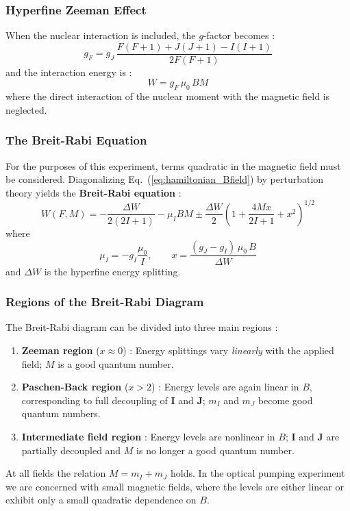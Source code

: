 \subsubsection*{Hyperfine Zeeman Effect}
 
When the nuclear interaction is included, the $g$-factor becomes :
\begin{equation}
    g_F = g_J\,\frac{F(F+1) + J(J+1) - I(I+1)}{2F(F+1)}
    \label{eq:gF}
\end{equation}
and the interaction energy is :
\begin{equation}
    W = g_F\,\mu_0\,BM
    \label{eq:W_hyperfine}
\end{equation}
where the direct interaction of the nuclear moment with the magnetic field is neglected.
 
\subsubsection*{The Breit-Rabi Equation}
 
For the purposes of this experiment, terms quadratic in the magnetic field must be
considered. Diagonalizing Eq.~(\ref{eq:hamiltonian_Bfield}) by perturbation theory yields
the \textbf{Breit-Rabi equation} :
\begin{equation}
    W(F,M) = -\frac{\Delta W}{2(2I+1)} - \mu_I BM
    \pm \frac{\Delta W}{2}
    \left(1 + \frac{4Mx}{2I+1} + x^2\right)^{1/2}
    \label{eq:breit_rabi}
\end{equation}
where
\begin{equation}
    \mu_I = -g_I\frac{\mu_0}{I},
    \qquad
    x = \frac{(g_J - g_I)\,\mu_0\,B}{\Delta W}
    \label{eq:BR_params}
\end{equation}
and $\Delta W$ is the hyperfine energy splitting.
 
\subsubsection*{Regions of the Breit-Rabi Diagram}
 
The Breit-Rabi diagram can be divided into three main regions :
\begin{enumerate}
    \item \textbf{Zeeman region} ($x \approx 0$) : Energy splittings vary \emph{linearly}
          with the applied field; $M$ is a good quantum number.
    \item \textbf{Paschen-Back region} ($x > 2$) : Energy levels are again linear in $B$,
          corresponding to full decoupling of $\mathbf{I}$ and $\mathbf{J}$; $m_I$ and
          $m_J$ become good quantum numbers.
    \item \textbf{Intermediate field region} : Energy levels are nonlinear in $B$;
          $\mathbf{I}$ and $\mathbf{J}$ are partially decoupled and $M$ is no longer a
          good quantum number.
\end{enumerate}
At all fields the relation $M = m_I + m_J$ holds. In the optical pumping experiment we are
concerned with small magnetic fields, where the levels are either linear or exhibit only a
small quadratic dependence on $B$.